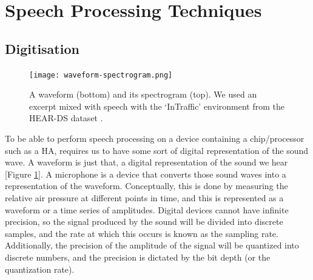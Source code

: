 \documentclass[logo,bsc,singlespacing,parskip,online]{infthesis}
\begin{document}


\newpage
\section{Speech Processing Techniques}
\subsection{Digitisation}
\begin{figure}[h]
   \centering
   \texttt{[image: waveform-spectrogram.png]}
   \caption{A waveform (bottom) and its spectrogram (top). 
   We used an excerpt mixed with speech with the `InTraffic'
   environment from the HEAR-DS dataset \citep{Huwel2020HearDS}.}
   \label{fig:waveform-spectrogram}
\end{figure}
To be able to perform speech processing on a device containing a chip/processor such as a HA, requires us 
to have some sort of digital representation of the sound wave. A waveform is just that, a digital representation 
of the sound we hear [Figure \ref{fig:waveform-spectrogram}]. A microphone is a device that converts those sound waves into a representation of the 
waveform. Conceptually, this is done by measuring the relative air pressure at different points in time, and 
this is represented as a waveform or a time series of amplitudes. Digital devices cannot have infinite precision, so the signal produced by the sound will 
be divided into discrete samples, and the rate at which this occurs is known as the sampling rate. Additionally,
the precision of the amplitude of the signal will be quantized into discrete numbers, and the precision is 
dictated by the bit depth (or the quantization rate).
\end{document}
